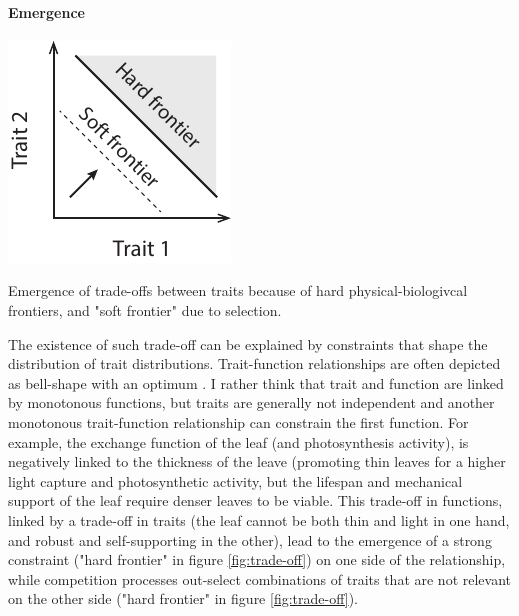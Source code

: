 \paragraph{Emergence}


\begin{marginfigure}[12pt]
    \includegraphics{./Figures/trade_off_emergence_m.pdf}
  \caption[Trade-off emergence]{Emergence of trade-offs between traits because of hard physical-biologivcal frontiers, and "soft frontier" due to selection.}
  \label{fig:trade-off}
\end{marginfigure}

The existence of such trade-off can be explained by constraints that shape the distribution of trait distributions. Trait-function relationships are often depicted as bell-shape with an optimum \parencite{albert_intraspecific_2010}. I rather think that trait and function are linked by monotonous functions, but traits are generally not independent and another monotonous trait-function relationship can constrain the first function. For example, the exchange function of the leaf (and photosynthesis activity), is negatively linked to the thickness of the leave (promoting thin leaves for a higher light capture and photosynthetic activity, but the lifespan and mechanical support of the leaf require denser leaves to be viable. This trade-off in functions, linked by a trade-off in traits (the leaf cannot be both thin and light in one hand, and robust and self-supporting in the other), lead to the emergence of a strong constraint ("hard frontier" in figure \ref{fig:trade-off}) on one side of the relationship, while competition processes out-select combinations of traits that are not relevant on the other side ("hard frontier" in figure \ref{fig:trade-off}).\\



